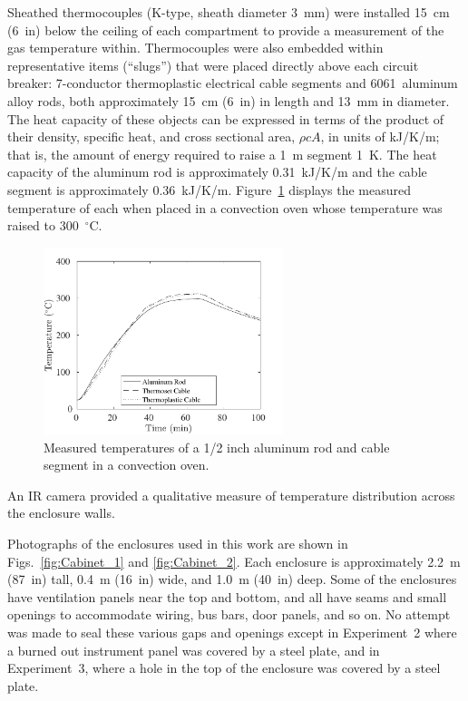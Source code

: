 \documentclass[12pt]{article}
\begin{document}
Sheathed thermocouples (K-type, sheath diameter 3~mm) were installed 15~cm (6~in) below the ceiling of each compartment to provide a measurement of the gas temperature within. Thermocouples were also embedded within representative items (``slugs'') that were placed directly above each circuit breaker: 7-conductor thermoplastic electrical cable segments and 6061~aluminum alloy rods, both approximately  15~cm (6~in) in length and 13~mm in diameter. The heat capacity of these objects can be expressed in terms of the product of their density, specific heat, and cross sectional area, $\rho c A$, in units of kJ/K/m; that is, the amount of energy required to raise a 1~m segment 1~K. The heat capacity of the aluminum rod is approximately 0.31~kJ/K/m and the cable segment is approximately 0.36~kJ/K/m. Figure~\ref{oven} displays the measured temperature of each when placed in a convection oven whose temperature was raised to 300~$^\circ$C.

\begin{figure}[!ht]
\centering
\includegraphics[height=2.15in]{../SCRIPT_FIGURES/Oven_Test} 
\caption[Measured temperatures of slug calorimeters in a convection oven]{Measured temperatures of a 1/2 inch aluminum rod and cable segment in a convection oven.}
\label{oven}
\end{figure}

An IR camera provided a qualitative measure of temperature distribution across the enclosure walls.

Photographs of the enclosures used in this work are shown in Figs.~\ref{fig:Cabinet_1} and \ref{fig:Cabinet_2}. Each enclosure is approximately 2.2~m (87~in) tall, 0.4~m (16~in) wide, and 1.0~m (40~in) deep. Some of the enclosures have ventilation panels near the top and bottom, and all have seams and small openings to accommodate wiring, bus bars, door panels, and so on. No attempt was made to seal these various gaps and openings except in Experiment~2 where a burned out instrument panel was covered by a steel plate, and in Experiment~3, where a hole in the top of the enclosure was covered by a steel plate.
\end{document}
